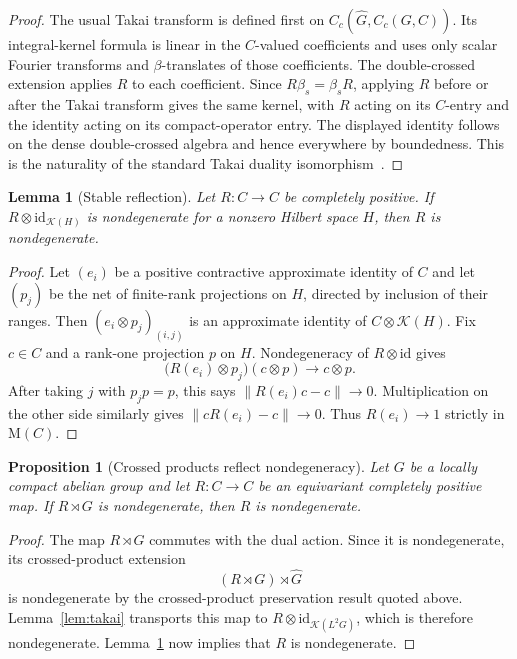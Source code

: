 \documentclass[11pt]{article}
\newtheorem{lemma}[theorem]{Lemma}
\newtheorem{proposition}[theorem]{Proposition}
\theoremstyle{remark}
\newcommand{\M}{\mathrm M}
\newcommand{\id}{\mathrm{id}}
\newcommand{\K}{\mathcal K}
\begin{document}
\begin{proof}
The usual Takai transform is defined first on
$C_c(\widehat G,C_c(G,C))$. Its integral-kernel formula is linear in the
$C$-valued coefficients and uses only scalar Fourier transforms and
$\beta$-translates of those coefficients. The double-crossed extension
applies $R$ to each coefficient. Since $R\beta_s=\beta_sR$, applying $R$
before or after the Takai transform gives the same kernel, with $R$ acting
on its $C$-entry and the identity acting on its compact-operator entry.
The displayed identity follows on the dense double-crossed algebra and hence
everywhere by boundedness. This is the naturality of the standard Takai
duality isomorphism~\cite{ImaiTakai}.
\end{proof}

\begin{lemma}[Stable reflection]\label{lem:stable}
Let $R:C\to C$ be completely positive. If
$R\otimes\id_{\K(H)}$ is nondegenerate for a nonzero Hilbert space $H$, then
$R$ is nondegenerate.
\end{lemma}

\begin{proof}
Let $(e_i)$ be a positive contractive approximate identity of $C$ and let
$(p_j)$ be the net of finite-rank projections on $H$, directed by inclusion
of their ranges. Then $(e_i\otimes p_j)_{(i,j)}$ is an approximate identity
of $C\otimes\K(H)$. Fix $c\in C$ and a rank-one projection $p$ on $H$.
Nondegeneracy of $R\otimes\id$ gives
\[
 \bigl(R(e_i)\otimes p_j\bigr)(c\otimes p)\longrightarrow c\otimes p.
\]
After taking $j$ with $p_jp=p$, this says
$\|R(e_i)c-c\|\to0$. Multiplication on the other side similarly gives
$\|cR(e_i)-c\|\to0$. Thus $R(e_i)\to1$ strictly in $\M(C)$.
\end{proof}

\begin{proposition}[Crossed products reflect nondegeneracy]
\label{prop:reflection}
Let $G$ be a locally compact abelian group and let $R:C\to C$ be an
equivariant completely positive map. If $R\rtimes G$ is nondegenerate, then
$R$ is nondegenerate.
\end{proposition}

\begin{proof}
The map $R\rtimes G$ commutes with the dual action. Since it is
nondegenerate, its crossed-product extension
\[
 (R\rtimes G)\rtimes\widehat G
\]
is nondegenerate by the crossed-product preservation result quoted above.
Lemma~\ref{lem:takai} transports this map to
$R\otimes\id_{\K(L^2G)}$, which is therefore nondegenerate.
Lemma~\ref{lem:stable} now implies that $R$ is nondegenerate.
\end{proof}
\end{document}
